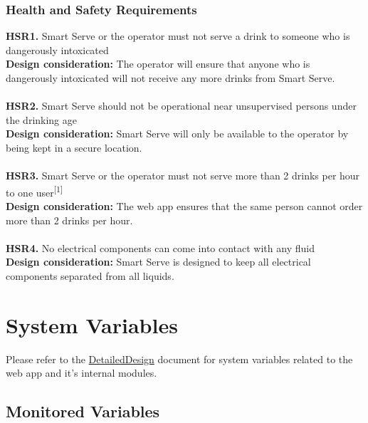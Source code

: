 \documentclass[12pt, titlepage]{article}
\begin{document}
\subsubsection{Health and Safety Requirements}
    \noindent\textbf{HSR1.} Smart Serve or the operator must not serve a drink to someone who is dangerously intoxicated \\
    \indent\textbf{Design consideration:} The operator will ensure that anyone who is dangerously intoxicated will not receive any more drinks from Smart Serve.\\\\
    \textbf{HSR2.} Smart Serve should not be operational near unsupervised persons under the drinking age \\
    \indent\textbf{Design consideration:} Smart Serve will only be available to the operator by being kept in a secure location.\\\\
    \textbf{HSR3.} Smart Serve or the operator must not serve more than 2 drinks per hour to one user\textsuperscript{[1]} \\
    \indent\textbf{Design consideration:} The web app ensures that the same person cannot order more than 2 drinks per hour.\\\\
    \textbf{HSR4.} No electrical components can come into contact with any fluid \\
    \indent\textbf{Design consideration:} Smart Serve is designed to keep all electrical components separated from all liquids.


 \section{System Variables}
Please refer to the \href{https://github.com/purefisher/Smart-Serve/blob/main/docs/Design/DetailedDesign.pdf}{DetailedDesign} document for system variables related to the web app and it's internal modules.

\subsection{Monitored Variables}
\end{document}
